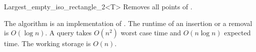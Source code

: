 \begin{ccRefClass}{Largest_empty_iso_rectangle_2<T>}
{Removes all points of \ccVar.}


\ccImplementation

The algorithm is an implementation of \cite{o-naler-90}. The runtime of an
insertion or a removal is $O(\log n)$. A query takes $O(n^2)$ worst
case time and $O(n \log n)$ expected time. The working storage is $
O(n)$.












\end{ccRefClass}


